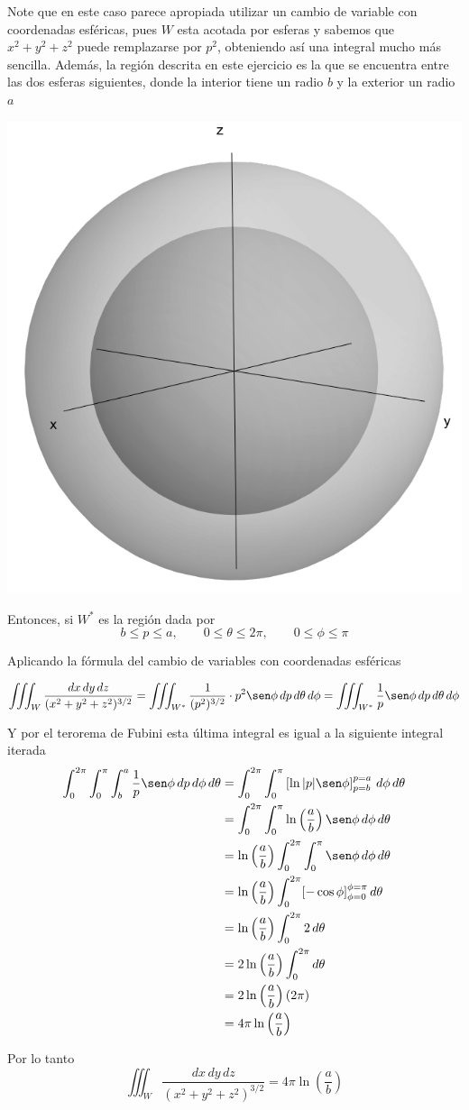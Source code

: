 Note que en este caso parece apropiada utilizar un cambio de variable con coordenadas esféricas, pues $W$ esta acotada por esferas y sabemos que $x^2 + y^2 + z^2$ puede remplazarse por $p^2$, obteniendo así una integral mucho más sencilla. Además, la región descrita en este ejercicio es la que se encuentra entre las dos esferas siguientes, donde la interior tiene un radio $b$ y la exterior un radio $a$

\begin{center}
	\includegraphics[width=0.35\linewidth]{figuras/esferas-ej25.pdf}
\end{center}

Entonces, si $W^*$ es la región dada por
\[b \leq p \leq a, \qquad 0 \leq \theta \leq 2\pi, \qquad 0 \leq \phi \leq \pi\]

Aplicando la fórmula del cambio de variables con coordenadas esféricas

\[\iiint_W \frac{dx\, dy\, dz}{(x^2 + y^2 + z^2)^{3/2}}	= \iiint_{W^*} \frac{1}{(p^2)^{3/2}} \cdot p^2\sen\phi\, dp\, d\theta\, d\phi = \iiint_{W^*} \frac{1}{p} \sen \phi\, dp\, d\theta\, d\phi\]

Y por el terorema de Fubini esta última integral es igual a la siguiente integral iterada
\begin{align*}
	\int_{0}^{2\pi} \int_{0}^{\pi} \int_b^a\frac{1}{p} \sen\phi \, dp\, d\phi\, d\theta &= \int_{0}^{2\pi} \int_{0}^{\pi} \left[\ln|p| \sen\phi\right]_{p=b}^{p=a} \, d\phi\, d\theta\\
	&= \int_{0}^{2\pi} \int_{0}^{\pi} \ln\left(\frac{a}{b}\right) \sen\phi \, d\phi\, d\theta\\
	&= \ln\left(\frac{a}{b}\right) \int_{0}^{2\pi} \int_{0}^{\pi} \sen\phi \, d\phi\, d\theta\\
	&= \ln\left(\frac{a}{b}\right) \int_{0}^{2\pi} [-\cos\phi]_{\phi=0}^{\phi=\pi}\, d\theta\\
	&= \ln\left(\frac{a}{b}\right) \int_{0}^{2\pi} 2\, d\theta\\
	&= 2\ln\left(\frac{a}{b}\right) \int_{0}^{2\pi} d\theta\\
	&= 2\ln\left(\frac{a}{b}\right) (2\pi)\\
	&= 4\pi\ln\left(\frac{a}{b}\right)
\end{align*}

Por lo tanto
\[\iiint_W \frac{dx\, dy\, dz}{(x^2 + y^2 + z^2)^{3/2}} = 4\pi\ln\left(\frac{a}{b}\right)\]